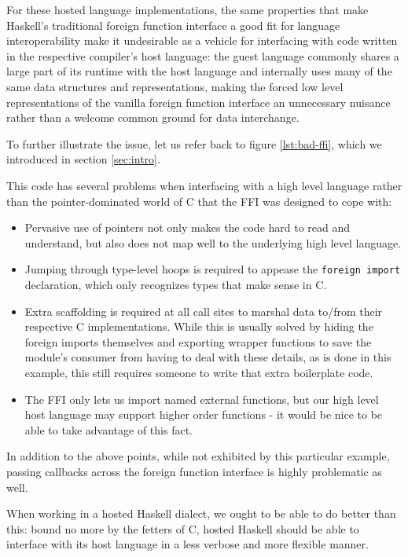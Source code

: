 \documentclass{sigplanconf}
\begin{document}
For these hosted language implementations, the same properties that make
Haskell's traditional foreign function interface a good fit for language
interoperability make it undesirable as a vehicle for interfacing with
code written in the respective compiler's host language: the guest language
commonly shares a large part of its runtime with the host language and
internally uses many of the same data structures and representations, making
the forced low level representations of the vanilla foreign function interface
an unnecessary nuisance rather than a welcome common ground for data
interchange.

To further illustrate the issue, let us refer back to figure \ref{lst:bad-ffi},
which we introduced in section \ref{sec:intro}.

This code has several problems when interfacing with a high level language
rather than the pointer-dominated world of C that the FFI was designed to
cope with:

\begin{itemize}
\item
  Pervasive use of pointers not only makes the code hard to read and
  understand, but also does not map well to the underlying high level
  language.
\item
  Jumping through type-level hoops is required to appease the
  \lstinline!foreign import! declaration, which only recognizes types that
  make sense in C.
\item
  Extra scaffolding is required at all call sites to marshal data to/from
  their respective C implementations. While this is usually solved
  by hiding the foreign imports themselves and exporting wrapper functions to
  save the module's consumer from having to deal with these details, as is done
  in this example, this still requires someone to write that extra
  boilerplate code.
\item
  The FFI only lets us import named external functions, but our high level
  host language may support higher order functions - it would be nice to be able
  to take advantage of this fact.
\end{itemize}

In addition to the above points, while not exhibited by this particular
example, passing callbacks across the foreign function interface is highly
problematic as well.

When working in a hosted Haskell dialect, we ought to be able to do better
than this: bound no more by the fetters of C, hosted Haskell should be able
to interface with its host language in a less verbose and more flexible manner.
\end{document}
